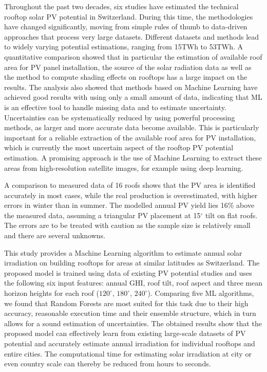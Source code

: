 Throughout the past two decades, six studies have estimated the technical rooftop solar PV potential in Switzerland. During this time, the methodologies have changed significantly, moving from simple rules of thumb to data-driven approaches that process very large datasets. Different datasets and methods lead to widely varying potential estimations, ranging from 15TWh to 53TWh. A quantitative comparison showed that in particular the estimation of available roof area for PV panel installation, the source of the solar radiation data as well as the method to compute shading effects on rooftops has a large impact on the results. The analysis also showed that methods based on Machine Learning have achieved good results with using only a small amount of data, indicating that ML is an effective tool to handle missing data and to estimate uncertainty. Uncertainties can be systematically reduced by using powerful processing methods, as larger and more accurate data become available. This is particularly important for a reliable extraction of the available roof area for PV installation, which is currently the most uncertain aspect of the rooftop PV potential estimation. A promising approach is the use of Machine Learning to extract these areas from high-resolution satellite images, for example using deep learning. 

A comparison to measured data of 16 roofs shows that the PV area is identified accurately in most cases, while the real production is overestimated, with higher errors in winter than in summer. The modelled annual PV yield lies 16\% above the measured data, assuming a triangular PV placement at 15$^\circ$ tilt on flat roofs. The errors are to be treated with caution as the sample size is relatively small and there are several unknowns.

This study provides a Machine Learning algorithm to estimate annual solar irradiation on building rooftops for areas at similar latitudes as Switzerland. The proposed model is trained using data of existing PV potential studies and uses the following six input features: annual GHI, roof tilt, roof aspect and three mean horizon heights for each roof ($120^\circ$, $180^\circ$, $240^\circ$). Comparing five ML algorithms, we found that Random Forests are most suited for this task due to their high accuracy, reasonable execution time and their ensemble structure, which in turn allows for a sound estimation of uncertainties. The obtained results show that the proposed model can effectively learn from existing large-scale datasets of PV potential and accurately estimate annual irradiation for individual rooftops and entire cities. The computational time for estimating solar irradiation at city or even country scale can thereby be reduced from hours to seconds.
